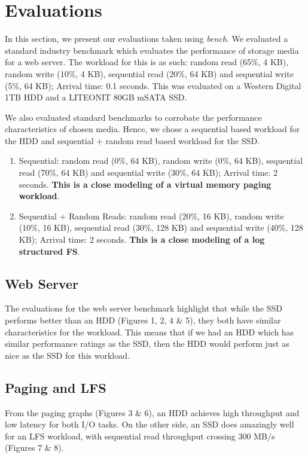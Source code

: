 \documentclass[10pt, author, twocolumn]{article}
\begin{document}
\section{Evaluations}
In this section, we present our evaluations taken using \textit{bench}. We evaluated a standard industry benchmark which evaluates the performance of storage media for a web server. The workload for this is as such: random read (65\%, 4 KB), random write (10\%, 4 KB), sequential read (20\%, 64 KB) and sequential write (5\%, 64 KB); Arrival time: 0.1 seconds. This was evaluated on a Western Digital 1TB HDD and a LITEONIT 80GB mSATA SSD.

We also evaluated standard benchmarks to corrobate the performance characteristics of chosen media. Hence, we chose a sequential based workload for the HDD and sequential + random read based workload for the SSD. 

\begin{enumerate}
    \item Sequential: random read (0\%, 64 KB), random write (0\%, 64 KB), sequential read (70\%, 64 KB) and sequential write (30\%, 64 KB); Arrival time: 2 seconds. \textbf{This is a close modeling of a virtual memory paging workload}.
    \item Sequential + Random Reads: random read (20\%, 16 KB), random write (10\%, 16 KB), sequential read (30\%, 128 KB) and sequential write (40\%, 128 KB); Arrival time: 2 seconds. \textbf{This is a close modeling of a log structured FS}.
\end{enumerate}

\subsection{Web Server}
The evaluations for the web server benchmark highlight that while the SSD performs better than an HDD (Figures 1, 2, 4 \& 5), they both have similar characteristics for the workload. This means that if we had an HDD which has similar performance ratings as the SSD, then the HDD would perform just as nice as the SSD for this workload. 

\subsection{Paging and LFS}
From the paging graphs (Figures 3 \& 6), an HDD achieves high throughput and low latency for both I/O tasks. On the other side, an SSD does amazingly well for an LFS workload, with sequential read throughput crossing 300 MB/s (Figures 7 \& 8). 
\end{document}
